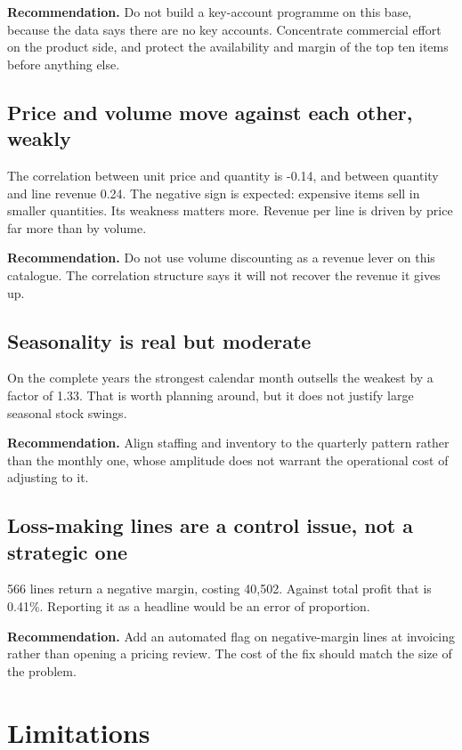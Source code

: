 \documentclass[11pt,a4paper]{article}
\begin{document}
\textbf{Recommendation.} Do not build a key-account programme on this base, because the
data says there are no key accounts. Concentrate commercial effort on the product side,
and protect the availability and margin of the top ten items before anything else.

\subsection{Price and volume move against each other, weakly}

The correlation between unit price and quantity is -0.14, and between
quantity and line revenue 0.24. The negative sign is expected:
expensive items sell in smaller quantities. Its weakness matters more. Revenue per line is
driven by price far more than by volume.

\textbf{Recommendation.} Do not use volume discounting as a revenue lever on this
catalogue. The correlation structure says it will not recover the revenue it gives up.

\subsection{Seasonality is real but moderate}

On the complete years the strongest calendar month outsells the weakest by a factor of
1.33. That is worth planning around, but it does not justify large
seasonal stock swings.

\textbf{Recommendation.} Align staffing and inventory to the quarterly pattern rather
than the monthly one, whose amplitude does not warrant the operational cost of adjusting
to it.

\subsection{Loss-making lines are a control issue, not a strategic one}

566 lines return a negative margin, costing 40{,}502.
Against total profit that is 0.41\%. Reporting it as a headline
would be an error of proportion.

\textbf{Recommendation.} Add an automated flag on negative-margin lines at invoicing
rather than opening a pricing review. The cost of the fix should match the size of the
problem.

\section{Limitations}
\end{document}
